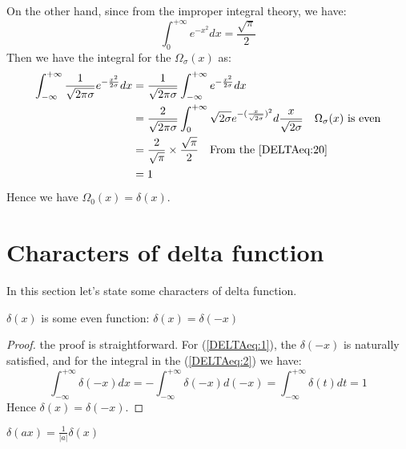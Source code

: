On the other hand, since from the improper integral theory, we have:
\begin{equation}\label{DELTAeq:20}
\int_{0}^{+\infty}e^{-x^{2}}dx = \frac{\sqrt{\pi}}{2}
\end{equation}
Then we have the integral for the $\Omega_{\sigma}(x)$ as:
\begin{align}\label{}
\int_{-\infty}^{+\infty}
\frac{1}{\sqrt{2\pi\sigma}}e^{-\frac{x^{2}}{2\sigma}} dx &=
\frac{1}{\sqrt{2\pi\sigma}}\int_{-\infty}^{+\infty}
e^{-\frac{x^{2}}{2\sigma}} dx \nonumber \\
&= \frac{2}{\sqrt{2\pi\sigma}}\int_{0}^{+\infty}\sqrt{2\sigma}
e^{-(\frac{x}{\sqrt{2\sigma}})^{2}} d\frac{x}{\sqrt{2\sigma}} \quad
\text{$\Omega_{\sigma}(x)$ is even} \nonumber \\
&=\frac{2}{\sqrt{\pi}}\times\frac{\sqrt{\pi}}{2} \quad
\text{From the \ref{DELTAeq:20}}\nonumber \\
&= 1
\end{align}
Hence we have $\Omega_{0}(x) = \delta(x)$.

\section{Characters of delta function}
\label{sec:character_delta_function}
%
%
%
%
In this section let's state some characters of delta function.

\begin{theorem}
$\delta(x)$ is some even function: $\delta(x) = \delta(-x)$
\end{theorem}

\begin{proof}
the proof is straightforward. For (\ref{DELTAeq:1}), the
$\delta(-x)$ is naturally satisfied, and for the integral in the
(\ref{DELTAeq:2}) we have:
\begin{equation}\label{}
\int_{-\infty}^{+\infty}\delta(-x)dx =
-\int_{-\infty}^{+\infty}\delta(-x)d(-x) =
\int_{-\infty}^{+\infty}\delta(t)dt = 1
\end{equation}
Hence  $\delta(x) = \delta(-x)$. \qedhere
\end{proof}

\begin{theorem}
$\delta(ax) = \frac{1}{|a|}\delta(x)$
\end{theorem}

